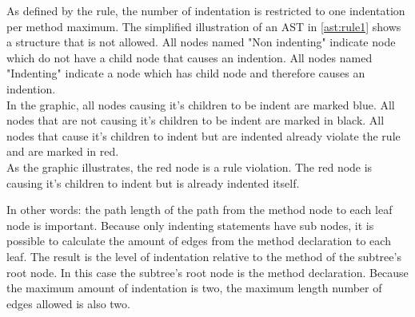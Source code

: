 As defined by the rule, the number of indentation is restricted to one indentation per method maximum. The simplified illustration of an \acf{AST} in \ref{ast:rule1} shows a structure that is not allowed. All nodes named "Non indenting" indicate node which do not have a child node that causes an indention. All nodes named "Indenting" indicate a node which has child node and therefore causes an indention.
\\

In the graphic, all nodes causing it's children to be indent are marked blue. All nodes that are not causing it's children to be indent are marked in black. 
All nodes that cause it's children to indent but are indented already violate the rule and are marked in red. 
\\

As the graphic illustrates, the red node is a rule violation. The red node is causing it's children to indent but is already indented itself. 
\\

\label{ast:rule1}

In other words: the path length of the path from the method node to each leaf node is important. Because only indenting statements have sub nodes, it is possible to calculate the amount of edges from the method declaration to each leaf. The result is the level of indentation relative to the method of the subtree's root node. In this case the subtree's root node is the method declaration. Because the maximum amount of indentation is two, the maximum length number of edges allowed is also two.
\\


